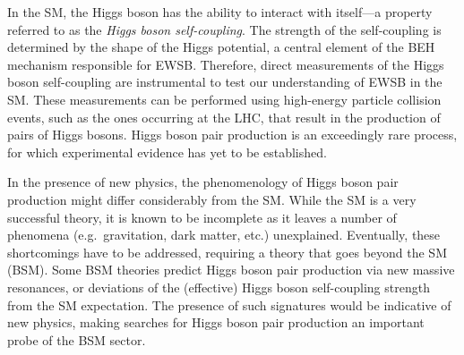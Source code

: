 In the SM, the Higgs boson has the ability to interact with itself---a property
referred to as the \emph{Higgs boson self-coupling}. The strength of the
self-coupling is determined by the shape of the Higgs potential, a central
element of the BEH mechanism responsible for EWSB.
Therefore, direct measurements of the Higgs boson self-coupling are instrumental
to test our understanding of EWSB in the SM. These measurements can be performed
using high-energy particle collision events, such as the ones occurring at the
LHC, that result in the production of pairs of Higgs bosons. Higgs boson pair
production is an exceedingly rare process, for which experimental evidence has
yet to be established.


In the presence of new physics, the phenomenology of Higgs boson pair production
might differ considerably from the SM. While the SM is a very successful theory,
it is known to be incomplete as it leaves a number of phenomena
(e.g.~gravitation, dark matter, etc.) unexplained. Eventually, these
shortcomings have to be addressed, requiring a theory that goes beyond the SM
(BSM). Some BSM theories predict Higgs boson pair production via new massive
resonances, or deviations of the (effective) Higgs boson self-coupling strength
from the SM expectation. The presence of such signatures would be indicative of
new physics, making searches for Higgs boson pair production an important probe
of the BSM sector.




